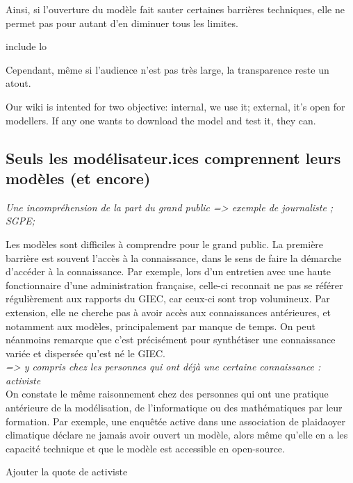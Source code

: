 Ainsi, si l'ouverture du modèle fait sauter certaines barrières techniques, elle ne permet pas pour autant d'en diminuer tous les limites. 

\begin{displayquote}
    include lo
\end{displayquote}
Cependant, même si l'audience n'est pas très large, la transparence reste un atout. 

\begin{displayquote}
Our wiki is intented for two objective: internal, we use it; external, it's open for modellers. If any one wants to download the model and test it, they can. 
\end{displayquote}

\subsection{Seuls les modélisateur.ices comprennent leurs modèles (et encore)}

\textit{Une incompréhension de la part du grand public
=> exemple de journaliste ; SGPE; }

Les modèles sont difficiles à comprendre pour le grand public. La première barrière est souvent l'accès à la connaissance, dans le sens de faire la démarche d'accéder à la connaissance. 
Par exemple, lors d'un entretien avec une haute fonctionnaire d'une administration française, celle-ci reconnait ne pas se référer régulièrement aux rapports du GIEC, car ceux-ci sont trop volumineux. Par extension, elle ne cherche pas à avoir accès aux connaissances antérieures, et notamment aux modèles, principalement par manque de temps. On peut néanmoins remarque que c'est précisément pour synthétiser une connaissance variée et dispersée qu'est né le GIEC. \\

\textit{=> y compris chez les personnes qui ont déjà une certaine connaissance : activiste} \\


On constate le même raisonnement chez des personnes qui ont une pratique antérieure de la modélisation, de l'informatique ou des mathématiques par leur formation. Par exemple, une enquêtée active dans une association de plaidaoyer climatique déclare ne jamais avoir ouvert un modèle, alors même qu'elle en a les capacité technique et que le modèle est accessible en open-source. 

\begin{displayquote}
    Ajouter la quote de activiste
\end{displayquote}

